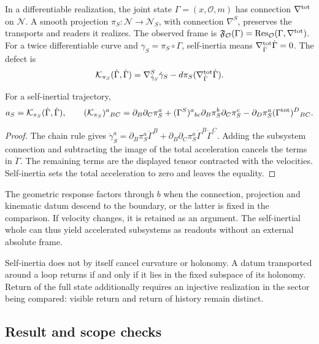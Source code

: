 In a differentiable realization, the joint state $\Gamma=(x,\mathcal O,m)$ has connection $\nabla^{\rm tot}$ on $\mathcal N$. A smooth projection $\pi_S:\mathcal N\to\mathcal N_S$, with connection $\nabla^S$, preserves the transports and readers it realizes. The observed frame is $\mathfrak F_{\mathcal O}(\Gamma)
=\operatorname{Res}_{\mathcal O}(\Gamma,\nabla^{\rm tot})$. For a twice differentiable curve and $\gamma_S=\pi_S\circ\Gamma$, self-inertia means $\nabla^{\rm tot}_{\dot\Gamma}\dot\Gamma=0$. The defect is
\[
\mathcal K_{\pi_S}(\dot\Gamma,\dot\Gamma)
=\nabla^S_{\dot\gamma_S}\dot\gamma_S
-d\pi_S(\nabla^{\rm tot}_{\dot\Gamma}\dot\Gamma).
\]
\begin{proposition}
\label{hmtcuatro:gea:aceleracion}
For a self-inertial trajectory,
\begin{equation}
a_S=\mathcal K_{\pi_S}(\dot\Gamma,\dot\Gamma),\qquad
(\mathcal K_{\pi_S})^a{}_{BC}
=\partial_B\partial_C\pi_S^a
+(\Gamma^S)^a{}_{bc}\partial_B\pi_S^b\partial_C\pi_S^c
-\partial_D\pi_S^a(\Gamma^{\rm tot})^D{}_{BC}.
\label{hmtcuatro:gea:defecto}
\end{equation}
\end{proposition}
\begin{proof}
The chain rule gives $\ddot\gamma_S^a=\partial_B\pi_S^a\ddot\Gamma^B
+\partial_B\partial_C\pi_S^a\dot\Gamma^B\dot\Gamma^C$. Adding the subsystem connection and subtracting the image of the total acceleration cancels the terms in $\ddot\Gamma$. The remaining terms are the displayed tensor contracted with the velocities. Self-inertia sets the total acceleration to zero and leaves the equality.
\end{proof}
The geometric response factors through $b$ when the connection, projection and kinematic datum descend to the boundary, or the latter is fixed in the comparison. If velocity changes, it is retained as an argument. The self-inertial whole can thus yield accelerated subsystems as readouts without an external absolute frame.

Self-inertia does not by itself cancel curvature or holonomy. A datum transported around a loop returns if and only if it lies in the fixed subspace of its holonomy. Return of the full state additionally requires an injective realization in the sector being compared: visible return and return of history remain distinct.

\subsection{Result and scope checks}
\label{hmtcuatro:gea:conclusion}

